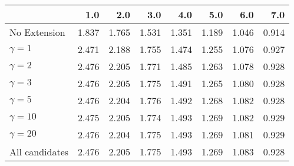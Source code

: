\begin{tabular}{lrrrrrrr}
\toprule
{} &   1.0 &   2.0 &   3.0 &   4.0 &   5.0 &   6.0 &   7.0 \\
\midrule
No Extension   & 1.837 & 1.765 & 1.531 & 1.351 & 1.189 & 1.046 & 0.914 \\
$\gamma = 1$   & 2.471 & 2.188 & 1.755 & 1.474 & 1.255 & 1.076 & 0.927 \\
$\gamma = 2$   & 2.476 & 2.205 & 1.771 & 1.485 & 1.263 & 1.078 & 0.928 \\
$\gamma = 3$   & 2.476 & 2.205 & 1.775 & 1.491 & 1.265 & 1.080 & 0.928 \\
$\gamma = 5$   & 2.476 & 2.204 & 1.776 & 1.492 & 1.268 & 1.082 & 0.928 \\
$\gamma = 10$  & 2.475 & 2.205 & 1.774 & 1.493 & 1.269 & 1.082 & 0.929 \\
$\gamma = 20$  & 2.476 & 2.204 & 1.775 & 1.493 & 1.269 & 1.081 & 0.929 \\
All candidates & 2.476 & 2.205 & 1.775 & 1.493 & 1.269 & 1.083 & 0.928 \\
\bottomrule
\end{tabular}
